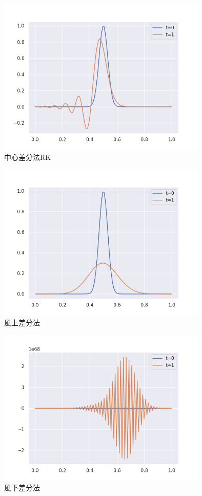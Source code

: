 \documentclass{jsarticle}
\begin{document}
\begin{figure}[htbp]
    \includegraphics[clip,width=10.0cm]{./adv_center_rk.png}
    \caption{中心差分法RK}
    \label{fig:7}
\end{figure}

\begin{figure}[htbp]
    \includegraphics[clip,width=10.0cm]{./adv_upwind_rk.png}
    \caption{風上差分法}
    \label{fig:8}
\end{figure}

\begin{figure}[htbp]
    \includegraphics[clip,width=10.0cm]{./adv_downwind_rk.png}
    \caption{風下差分法}
    \label{fig:9}
\end{figure}


\end{document}
